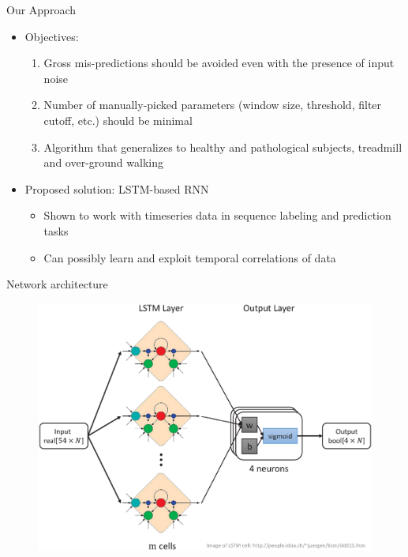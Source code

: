 \documentclass{beamer}
\begin{document}
\begin{frame}{Our Approach}
    \begin{itemize}
        \item Objectives:
        \begin{enumerate}
            \item Gross mis-predictions should be avoided even with the presence of input noise
            \item Number of manually-picked parameters (window size, threshold, filter cutoff, etc.) should be minimal
            \item Algorithm that generalizes to healthy and pathological subjects, treadmill and over-ground walking
        \end{enumerate}
        \item Proposed solution: LSTM-based RNN
        \begin{itemize}
            \item Shown to work with timeseries data in sequence labeling and prediction tasks
            \item Can possibly learn and exploit temporal correlations of data
        \end{itemize}
    \end{itemize}
\end{frame}

\begin{frame}{Network architecture}
    \begin{figure}[H]
        \begin{center}
        \includegraphics[height=.77\textheight]{figures/network.eps} \\
        \end{center}
    \end{figure}
\end{frame}
\end{document}
